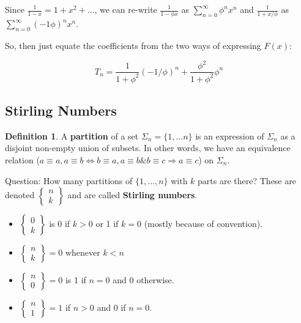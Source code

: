 \documentclass[12pt]{article}
\theoremstyle{definition}
\newtheorem{defn}{Definition}
\begin{document}
Since $\frac{1}{1-x} = 1 + x^2 + \ldots$, we can re-write $\frac{1}{1 - \phi
x}$ as $\sum_{n=0}^\infty\phi^n x^n$ and $\frac{1}{1 + x/\phi}$ as
$\sum_{n=0}^\infty (-1\phi)^n x^n$. 

So, then just equate the coefficients from the two ways of expressing $F(x)$:

$$T_n = \frac{1}{1 + \phi^2}(-1/\phi)^n + \frac{\phi^2}{1 + \phi^2} \phi^n$$

\subsection{Stirling Numbers}

\begin{defn}
A \textbf{partition} of a set $\Sigma_n = \{1, \ldots n \}$ is an expression of
$\Sigma_n$ as a disjoint non-empty union of subsets. In other words, we have an
equivalence relation ($a \equiv a, a \equiv b \Leftrightarrow b \equiv a, a
\equiv b \& b \equiv c \Rightarrow a \equiv c$) on $\Sigma_n$.
\end{defn}

Question: How many partitions of $\{1, \ldots, n\}$ with $k$ parts are there?
These are denoted $\begin{Bmatrix}n\\ k \end{Bmatrix}$ and are called
\textbf{Stirling numbers}.

\begin{itemize}
    \item $\begin{Bmatrix} 0 \\ k \end{Bmatrix}$ is 0 if $k > 0$ or 1 if $k =
        0$ (mostly because of convention). 
    \item $\begin{Bmatrix} n \\ k \end{Bmatrix} = 0$ whenever $k < n$ 
    \item $\begin{Bmatrix} n \\ 0 \end{Bmatrix} = 0$ is 1 if $n = 0$ and 0 otherwise.
    \item $\begin{Bmatrix} n \\ 1 \end{Bmatrix} = 1$ if $n  > 0$ and 0 if $n = 0$.
\end{itemize}
\end{document}
